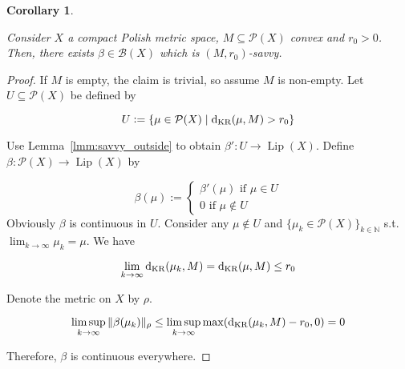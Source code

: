 \documentclass[11pt]{article}
\theoremstyle{definition}
\theoremstyle{plain}
\newtheorem{corollary}{Corollary}%
\newcommand{\Nats}{\mathbb{N}}
\newcommand{\N}[1]{\lVert #1 \rVert}
\newcommand{\Sq}[2]{\{#1\}_{#2 \in \Nats}}
\newcommand{\PM}{\mathcal{P}}
\newcommand{\Lp}{{\operatorname{Lip}}}
\newcommand{\DKR}{\operatorname{d}_{\textnormal{KR}}}
\newcommand{\Gm}{\mathcal{B}}
\begin{document}
\begin{samepage}
\begin{corollary}
\label{crl:savvy}

Consider $X$ a compact Polish metric space, $M \subseteq \PM(X)$ convex and $r_0 > 0$. Then, there exists $\beta \in \Gm(X)$ which is $(M,r_0)$-savvy.

\end{corollary}
\end{samepage}

\begin{proof}

If $M$ is empty, the claim is trivial, so assume $M$ is non-empty. Let $U \subseteq \PM(X)$ be defined by

$$U:=\{\mu \in \PM(X) \mid \DKR(\mu, M) > r_0\}$$

Use Lemma~\ref{lmm:savvy_outside} to obtain $\beta': U \rightarrow \Lp(X)$. Define $\beta: \PM(X) \rightarrow \Lp(X)$ by

$$\beta(\mu):=\begin{cases}\beta'(\mu) \text{ if } \mu \in U\\0 \text { if } \mu \not\in U\end{cases}$$ 
Obviously $\beta$ is continuous in $U$. Consider any $\mu \not\in U$ and $\Sq{\mu_k \in \PM(X)}{k}$ s.t. $\lim_{k \rightarrow \infty} \mu_k = \mu$. We have 

$$\lim_{k \rightarrow \infty} \DKR(\mu_k,M) = \DKR(\mu, M) \leq r_0$$

Denote the metric on $X$ by $\rho$. 

$$\limsup_{k \rightarrow \infty}{\N{\beta(\mu_k)}_\rho} \leq \limsup_{k \rightarrow \infty}{\max(\DKR(\mu_k,M) - r_0, 0)} = 0$$

Therefore, $\beta$ is continuous everywhere.
\end{proof}
\end{document}
